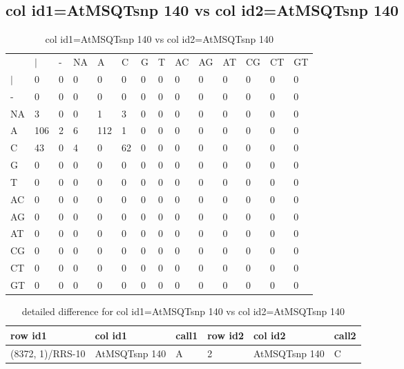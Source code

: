 \subsection{col id1=AtMSQTsnp 140 vs col id2=AtMSQTsnp 140}
\begin{center}
\begin{longtable}{|l|l|l|l|l|l|l|l|l|l|l|l|l|l|}
\caption{col id1=AtMSQTsnp 140 vs col id2=AtMSQTsnp 140} \label{table_dm722}\\
\hline
\\
\hline
&$|$&-&NA&A&C&G&T&AC&AG&AT&CG&CT&GT\\
$|$&0&0&0&0&0&0&0&0&0&0&0&0&0\\
-&0&0&0&0&0&0&0&0&0&0&0&0&0\\
NA&3&0&0&1&3&0&0&0&0&0&0&0&0\\
A&106&2&6&112&1&0&0&0&0&0&0&0&0\\
C&43&0&4&0&62&0&0&0&0&0&0&0&0\\
G&0&0&0&0&0&0&0&0&0&0&0&0&0\\
T&0&0&0&0&0&0&0&0&0&0&0&0&0\\
AC&0&0&0&0&0&0&0&0&0&0&0&0&0\\
AG&0&0&0&0&0&0&0&0&0&0&0&0&0\\
AT&0&0&0&0&0&0&0&0&0&0&0&0&0\\
CG&0&0&0&0&0&0&0&0&0&0&0&0&0\\
CT&0&0&0&0&0&0&0&0&0&0&0&0&0\\
GT&0&0&0&0&0&0&0&0&0&0&0&0&0\\
\hline
\end{longtable}
\end{center}

\begin{center}
\begin{longtable}{|l|l|l|l|l|l|}
\caption{detailed difference for col id1=AtMSQTsnp 140 vs col id2=AtMSQTsnp 140} \label{table_dm723}\\
\hline
row id1&col id1&call1&row id2&col id2&call2\\
\hline
(8372, 1)/RRS-10&AtMSQTsnp 140&A&2&AtMSQTsnp 140&C\\
\hline
\end{longtable}
\end{center}

